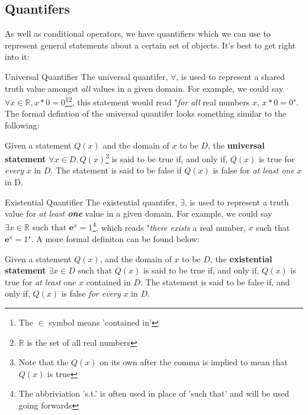 \newpage 
\subsection{Quantifers}
As well as conditional operators, we have quantifiers which we can use to represent general statements about a certain set of objects. It's best to get right into it: 

\begin{definition}{Universal Quantifier}{}
  The universal quantifer, $\forall$, is used to represent a shared truth value amongst \textit{all} values in a given domain. For example, we could say $\forall x \in \mathbb{R}, x * 0 = 0$\footnote{The $\in$ symbol means 'contained in'}\footnote{$\mathbb{R}$ is the set of all real numbers}, this statement would read "\textit{for all} real numbers $x$, $x * 0 = 0$". The formal defintion of the universal quantifer looks something similar to the following: 
  \begin{center}
    Given a statement $Q(x)$ and the domain of $x$ to be $D$, the \textbf{universal statement} $\forall x \in D, Q(x)$\footnote{Note that the $Q(x)$ on its own after the comma is implied to mean that $Q(x)$ is true} is said to be true if, and only if, $Q(x)$ is true for \textit{every} $x$ in $D$. The statement is said to be false if $Q(x)$ is false for \textit{at least one} $x$ in D.
  \end{center}
\end{definition}

\begin{definition}{Existential Quantifier}{}
  The existential quantifer, $\exists$, is used to represent a truth value for \textit{at least \textbf{one}} value in a given domain. For example, we could say $\exists x \in \mathbb {R} \text{ such that } \mathrm{\textbf{e}}^{x} = 1$\footnote{The abbriviation 's.t.' is often used in place of 'such that' and will be used going forwards}, which reads "\textit{there exists} a real number, $x$ such that $\mathrm{\textbf{e}}^{x} = 1$". A more formal definiton can be found below:
  \begin{center}
    Given a statement $Q(x)$, and the domain of $x$ to be $D$, the \textbf{existential statement} $\exists x \in D \text{ such that } Q(x)$ is said to be true if, and only if, $Q(x)$ is true for \textit{at least} one $x$ contained in $D$. The statement is said to be false if, and only if, $Q(x)$ is false \textit{for every} $x$ in $D$.
  \end{center}
\end{definition}

